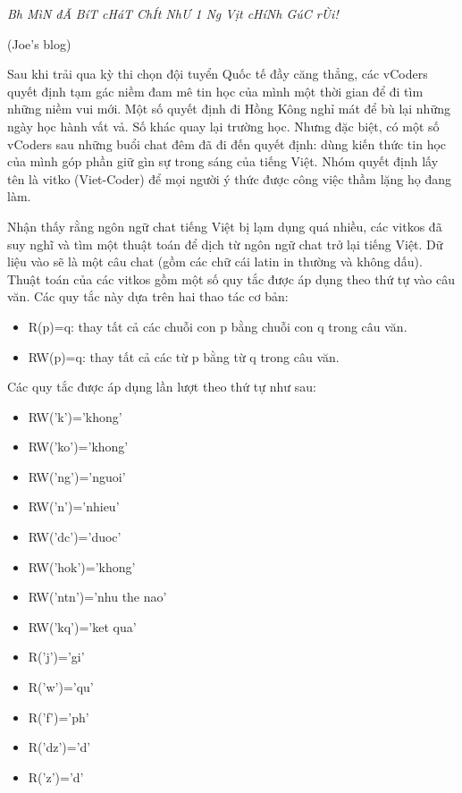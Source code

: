 

\textit{    Bh MìN đÃ BíT cHáT ChÍt NhƯ 1 Ng Vịt cHíNh GúC rÙi!   }


   (Joe's blog)    

   Sau khi trải qua kỳ thi chọn đội tuyển Quốc tế đầy căng thẳng, các vCoders quyết định tạm gác niềm đam mê tin học của mình một thời gian để đi tìm những niềm vui mới. Một số quyết định đi Hồng Kông nghỉ mát để bù lại những ngày học hành vất vả. Số khác quay lại trường học. Nhưng đặc biệt, có một số vCoders sau những buổi chat đêm đã đi đến quyết định: dùng kiến thức tin học của mình góp phần giữ gìn sự trong sáng của tiếng Việt. Nhóm quyết định lấy tên là vitko (Viet-Coder) để mọi người ý thức được công việc thầm lặng họ đang làm.  

   Nhận thấy rằng ngôn ngữ chat tiếng Việt bị lạm dụng quá nhiều, các vitkos đã suy nghĩ và tìm một thuật toán để dịch từ ngôn ngữ chat trở lại tiếng Việt. Dữ liệu vào sẽ là một câu chat (gồm các chữ cái latin in thường và không dấu). Thuật toán của các vitkos gồm một số quy tắc được áp dụng theo thứ tự vào câu văn. Các quy tắc này dựa trên hai thao tác cơ bản:  
\begin{itemize}
	\item     R(p)=q: thay tất cả các chuỗi con p bằng chuỗi con q trong câu văn.   
	\item     RW(p)=q: thay tất cả các từ p bằng từ q trong câu văn.   
\end{itemize}

   Các quy tắc được áp dụng lần lượt theo thứ tự như sau:  
\begin{itemize}
	\item     RW('k')='khong'   
	\item     RW('ko')='khong'   
	\item     RW('ng')='nguoi'   
	\item     RW('n')='nhieu'   
	\item     RW('dc')='duoc'   
	\item     RW('hok')='khong'   
	\item     RW('ntn')='nhu the nao'   
	\item     RW('kq')='ket qua'   
	\item     R('j')='gi'   
	\item     R('w')='qu'   
	\item     R('f')='ph'   
	\item     R('dz')='d'   
	\item     R('z')='d'   
\end{itemize}

